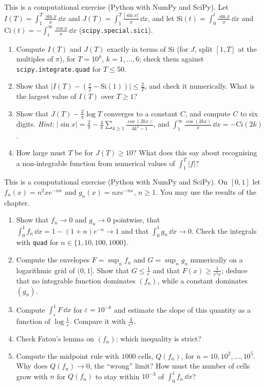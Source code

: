 \begin{exercise}\label{ex:ig-sine}
\medium This is a computational exercise (Python with NumPy and SciPy). Let
$I(T)=\int_1^T\frac{\sin x}x\,\dd x$ and $J(T)=\int_1^T\frac{|\sin x|}x\,\dd x$, and let
$\mathrm{Si}(t)=\int_0^t\frac{\sin x}x\,\dd x$ and $\mathrm{Ci}(t)=-\int_t^\infty\frac{\cos x}x\,\dd x$
(\texttt{scipy.special.sici}).
\begin{enumerate}[label=(\alph*)]
  \item Compute $I(T)$ and $J(T)$ exactly in terms of $\mathrm{Si}$ (for $J$, split $[1,T]$ at the
    multiples of $\pi$), for $T=10^k$, $k=1,\dots,6$; check them against
    \texttt{scipy.integrate.quad} for $T\le50$.
  \item Show that $\big|I(T)-(\frac\pi2-\mathrm{Si}(1))\big|\le\frac2T$, and check it numerically.
    What is the largest value of $I(T)$ over $T\ge1$?
  \item Show that $J(T)-\frac2\pi\log T$ converges to a constant $C$, and compute $C$ to six
    digits. \emph{Hint:} $|\sin x|=\frac2\pi-\frac4\pi\sum_{k\ge1}\frac{\cos(2kx)}{4k^2-1}$, and
    $\int_1^\infty\frac{\cos(2kx)}x\,\dd x=-\mathrm{Ci}(2k)$.
  \item How large must $T$ be for $J(T)\ge10$? What does this say about recognising a
    non-integrable function from numerical values of $\int_1^T|f|$?
\end{enumerate}
\end{exercise}

\begin{exercise}\label{ex:ig-no-domination}
\medium This is a computational exercise (Python with NumPy and SciPy). On $[0,1]$ let
$f_n(x)=n^2xe^{-nx}$ and $g_n(x)=nxe^{-nx}$, $n\ge1$. You may use the results of the chapter.
\begin{enumerate}[label=(\alph*)]
  \item Show that $f_n\to0$ and $g_n\to0$ pointwise, that $\int_0^1f_n\,\dd x=1-(1+n)e^{-n}\to1$
    and that $\int_0^1g_n\,\dd x\to0$. Check the integrals with \texttt{quad} for
    $n\in\{1,10,100,1000\}$.
  \item Compute the envelopes $F=\sup_nf_n$ and $G=\sup_ng_n$ numerically on a logarithmic grid
    of $(0,1]$. Show that $G\le\frac1e$ and that $F(x)\ge\frac1{e^2x}$; deduce that no integrable
    function dominates $(f_n)$, while a constant dominates $(g_n)$.
  \item Compute $\int_\varepsilon^1F\,\dd x$ for $\varepsilon=10^{-k}$ and estimate the slope of
    this quantity as a function of $\log\frac1\varepsilon$. Compare it with $\frac4{e^2}$.
  \item Check Fatou's lemma on $(f_n)$: which inequality is strict?
  \item Compute the midpoint rule with $1000$ cells, $Q(f_n)$, for $n=10,10^2,\dots,10^5$. Why
    does $Q(f_n)\to0$, the ``wrong'' limit? How must the number of cells grow with $n$ for
    $Q(f_n)$ to stay within $10^{-3}$ of $\int_0^1f_n\,\dd x$?
\end{enumerate}
\end{exercise}

